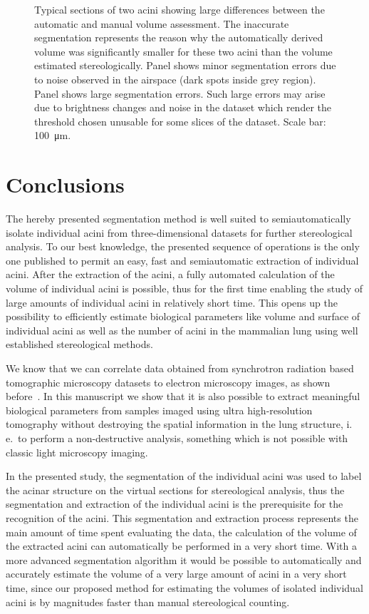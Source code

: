 \documentclass[paper=a4,twocolumn=true,DIV=calc,abstract,english]{scrartcl}
\newcommand{\ie}{i.\,e.\ }
\begin{document}
\begin{figure}
{		\label{subfig:60e_acinus38}%
	}%
	\hfill%
	\caption{Typical sections of two acini showing large differences between the automatic and manual volume assessment.
		The inaccurate segmentation represents the reason why the automatically derived volume was significantly smaller for these two acini than the volume estimated stereologically.
		Panel \protect{} shows minor segmentation errors due to noise observed in the airspace (dark spots inside grey region).
		Panel \protect{} shows large segmentation errors.
		Such large errors may arise due to brightness changes and noise in the dataset which render the threshold chosen unusable for some slices of the dataset.
		Scale bar: \SI{100}{\micro\meter}.}
	\label{fig:MeVisSegmentation}
\end{figure}

\section{Conclusions}
The hereby presented segmentation method is well suited to semiautomatically isolate individual acini from three-dimensional datasets for further stereological analysis.
To our best knowledge, the presented sequence of operations is the only one published to permit an easy, fast and semiautomatic extraction of individual acini.
After the extraction of the acini, a fully automated calculation of the volume of individual acini is possible, thus for the first time enabling the study of large amounts of individual acini in relatively short time.
This opens up the possibility to efficiently estimate biological parameters like volume and surface of individual acini as well as the number of acini in the mammalian lung using well established stereological methods.

We know that we can correlate data obtained from synchrotron radiation based tomographic microscopy datasets to electron microscopy images, as shown before~\citep{Haberthuer2009}.
In this manuscript we show that it is also possible to extract meaningful biological parameters from samples imaged using ultra high-resolution tomography without destroying the spatial information in the lung structure, \ie to perform a non-destructive analysis, something which is not possible with classic light microscopy imaging.

In the presented study, the segmentation of the individual acini was used to label the acinar structure on the virtual sections for stereological analysis, thus the segmentation and extraction of the individual acini is the prerequisite for the recognition of the acini.
This segmentation and extraction process represents the main amount of time spent evaluating the data, the calculation of the volume of the extracted acini can automatically be performed in a very short time.
With a more advanced segmentation algorithm it would be possible to automatically and accurately estimate the volume of a very large amount of acini in a very short time, since our proposed method for estimating the volumes of isolated individual acini is by magnitudes faster than manual stereological counting.
\end{document}
